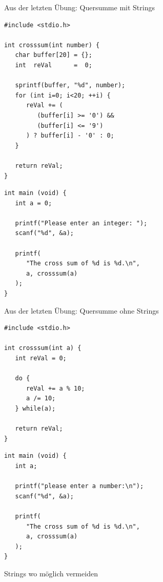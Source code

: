 \begin{frame}[fragile]{Aus der letzten Übung: Quersumme mit Strings}
%
\begin{codebox}
\begin{verbatim}
#include <stdio.h>

int crosssum(int number) {
   char buffer[20] = {};
   int  reVal      =  0;

   sprintf(buffer, "%d", number);
   for (int i=0; i<20; ++i) {
      reVal += (
         (buffer[i] >= '0') && 
         (buffer[i] <= '9')
      ) ? buffer[i] - '0' : 0;
   }

   return reVal;
}
\end{verbatim}
\end{codebox}
%
\begin{codebox}[...Fortsetzung]
\begin{verbatim}
int main (void) {
   int a = 0;

   printf("Please enter an integer: ");
   scanf("%d", &a);

   printf(
      "The cross sum of %d is %d.\n",
      a, crosssum(a)
   );
}
\end{verbatim}
\end{codebox}
%
\end{frame}


\begin{frame}[fragile]{Aus der letzten Übung: Quersumme ohne Strings}
%
\begin{codebox}
\begin{verbatim}
#include <stdio.h>

int crosssum(int a) {
   int reVal = 0;

   do {
      reVal += a % 10;
      a /= 10;
   } while(a);

   return reVal;
}
\end{verbatim}
\end{codebox}
%
\begin{codebox}[...Fortsetzung]
\begin{verbatim}
int main (void) {
   int a;

   printf("please enter a number:\n");
   scanf("%d", &a);

   printf(
      "The cross sum of %d is %d.\n",
      a, crosssum(a)
   );
}
\end{verbatim}
\end{codebox}
%
\begin{hintbox}
Strings wo möglich vermeiden
\end{hintbox}
%
\end{frame}

